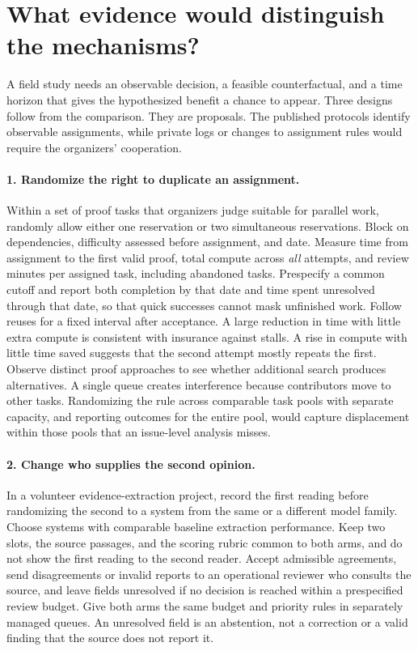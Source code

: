 \documentclass[11pt,letterpaper]{article}
\begin{document}
\section{What evidence would distinguish the mechanisms?}

A field study needs an observable decision, a feasible counterfactual, and a time horizon that gives the hypothesized benefit a chance to appear. Three designs follow from the comparison. They are proposals. The published protocols identify observable assignments, while private logs or changes to assignment rules would require the organizers' cooperation.

\paragraph{1. Randomize the right to duplicate an assignment.}
Within a set of proof tasks that organizers judge suitable for parallel work, randomly allow either one reservation or two simultaneous reservations. Block on dependencies, difficulty assessed before assignment, and date. Measure time from assignment to the first valid proof, total compute across \emph{all} attempts, and review minutes per assigned task, including abandoned tasks. Prespecify a common cutoff and report both completion by that date and time spent unresolved through that date, so that quick successes cannot mask unfinished work. Follow reuses for a fixed interval after acceptance. A large reduction in time with little extra compute is consistent with insurance against stalls. A rise in compute with little time saved suggests that the second attempt mostly repeats the first. Observe distinct proof approaches to see whether additional search produces alternatives. A single queue creates interference because contributors move to other tasks. Randomizing the rule across comparable task pools with separate capacity, and reporting outcomes for the entire pool, would capture displacement within those pools that an issue-level analysis misses.

\paragraph{2. Change who supplies the second opinion.}
In a volunteer evidence-extraction project, record the first reading before randomizing the second to a system from the same or a different model family. Choose systems with comparable baseline extraction performance. Keep two slots, the source passages, and the scoring rubric common to both arms, and do not show the first reading to the second reader. Accept admissible agreements, send disagreements or invalid reports to an operational reviewer who consults the source, and leave fields unresolved if no decision is reached within a prespecified review budget. Give both arms the same budget and priority rules in separately managed queues. An unresolved field is an abstention, not a correction or a valid finding that the source does not report it.
\end{document}
